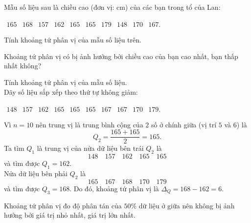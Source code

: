 \begin{bt}%
	Mẫu số liệu sau là chiều cao (đơn vị: cm) của các bạn trong tổ của Lan:
	\begin{center}
		$\begin{array}{llllllllll}165 & 168 & 157 & 162 & 165 & 165 & 179 & 148 & 170 & 167 .\end{array}$
	\end{center}
	\begin{listEX}[1]
		\item Tính khoảng tứ phân vị của mẫu số liệu trên.
		\item Khoảng tứ phân vị có bị ảnh hưởng bởi chiều cao của bạn cao nhất, bạn thấp nhất không?
	\end{listEX}
	\loigiai
	{
		\begin{listEX}[1]
			\item Tính khoảng tứ phân vị của mẫu số liệu.\\
	Dãy số liệu sắp xếp theo thứ tự không giảm:
	\begin{center}
	$\begin{array}{llllllllllll}148 & 157 & 162 & 165 & 165 & 165 & 167 & 167 & 170 & 179 .\end{array}$
	\end{center}
	Vì $n=10$ nên trung vị là trung bình cộng của $2$ số ở chính giữa (vị trí $5$ và $6$) là $$Q_2=\dfrac{165+165}{2}=165.$$
	Ta tìm $Q_{1}$ là trung vị của nửa dữ liệu bên trái $Q_{2}$ là 
	$$148 \quad 157 \quad 162 \quad 165 \quad 165$$
	và tìm được $Q_{1}=162$.\\
	Nửa dữ liệu bên phải $Q_{2}$ là $$165 \quad 167 \quad 168 \quad 170 \quad 179$$
	và tìm được $Q_{3}=168$.
	Do đó, khoảng tứ phân vị là $\Delta_{Q}=168-162=6$.
	\item  Khoảng tứ phân vị đo độ phân tán của $50 \%$ dữ liệu ở giữa nên không bị ảnh hưởng bởi giá trị nhỏ nhất, giá trị lớn nhất.
\end{listEX}
	}
\end{bt}

